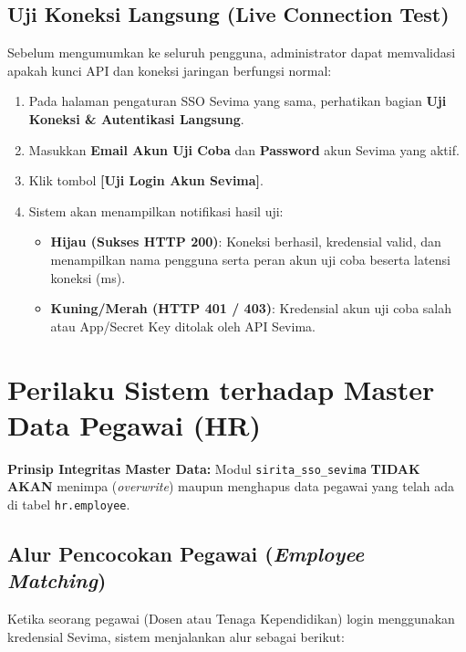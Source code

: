 \documentclass[11pt,a4paper]{article}
\begin{document}
\subsection{Uji Koneksi Langsung (Live Connection Test)}
Sebelum mengumumkan ke seluruh pengguna, administrator dapat memvalidasi apakah kunci API dan koneksi jaringan berfungsi normal:
\begin{enumerate}
    \item Pada halaman pengaturan SSO Sevima yang sama, perhatikan bagian \textbf{Uji Koneksi \& Autentikasi Langsung}.
    \item Masukkan \textbf{Email Akun Uji Coba} dan \textbf{Password} akun Sevima yang aktif.
    \item Klik tombol \textbf{[Uji Login Akun Sevima]}.
    \item Sistem akan menampilkan notifikasi hasil uji:
    \begin{itemize}
        \item \textbf{Hijau (Sukses HTTP 200)}: Koneksi berhasil, kredensial valid, dan menampilkan nama pengguna serta peran akun uji coba beserta latensi koneksi (ms).
        \item \textbf{Kuning/Merah (HTTP 401 / 403)}: Kredensial akun uji coba salah atau App/Secret Key ditolak oleh API Sevima.
    \end{itemize}
\end{enumerate}

\newpage
\section{Perilaku Sistem terhadap Master Data Pegawai (HR)}

\begin{successbox}
\textbf{Prinsip Integritas Master Data:}
Modul \texttt{sirita\_sso\_sevima} \textbf{TIDAK AKAN} menimpa (\textit{overwrite}) maupun menghapus data pegawai yang telah ada di tabel \texttt{hr.employee}.
\end{successbox}

\subsection{Alur Pencocokan Pegawai (\textit{Employee Matching})}
Ketika seorang pegawai (Dosen atau Tenaga Kependidikan) login menggunakan kredensial Sevima, sistem menjalankan alur sebagai berikut:
\end{document}
